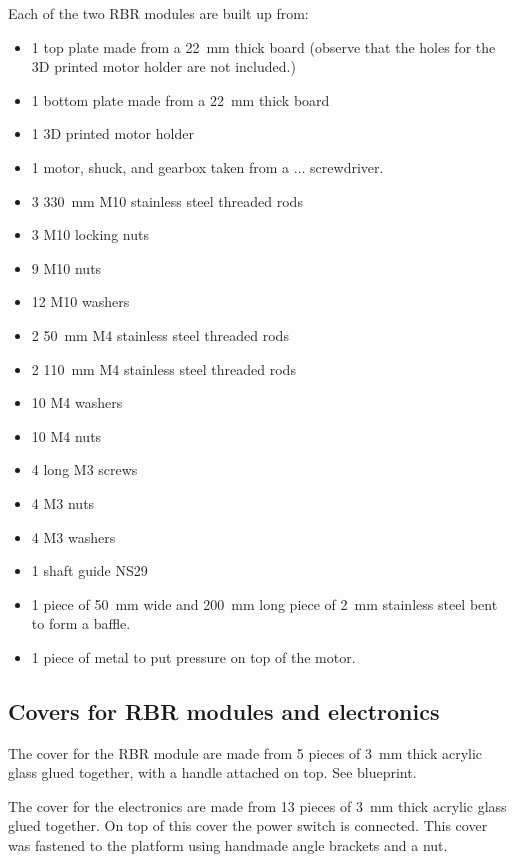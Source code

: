 Each of the two RBR modules are built up from:

\begin{itemize}
  \item 1 top plate made from a 22~mm thick board (observe that the holes for
    the 3D printed motor holder are not included.)
  \item 1 bottom plate made from a 22~mm thick board
  \item 1 3D printed motor holder
  \item 1 motor, shuck, and gearbox taken from a $\dots$
    screwdriver.
  \item 3 330~mm M10 stainless steel threaded rods
  \item 3 M10 locking nuts
  \item 9 M10 nuts
  \item 12 M10 washers
  \item 2 50~mm M4 stainless steel threaded rods
  \item 2 110~mm M4 stainless steel threaded rods
  \item 10 M4 washers
  \item 10 M4 nuts
  \item 4 long M3 screws
  \item 4 M3 nuts
  \item 4 M3 washers
  \item 1 shaft guide NS29
  \item 1 piece of 50~mm wide and 200~mm long piece of 2~mm stainless steel
    bent to form a baffle.
  \item 1 piece of metal to put pressure on top of the motor.
\end{itemize}


\subsection{Covers for RBR modules and electronics}

The cover for the RBR module are made from 5 pieces of 3~mm thick acrylic glass
glued together, with a handle attached on top. See blueprint.

The cover for the electronics are made from 13 pieces of 3~mm thick acrylic glass
glued together. On top of this cover the power switch is connected. This cover
was fastened to the platform using handmade angle brackets and a nut.

